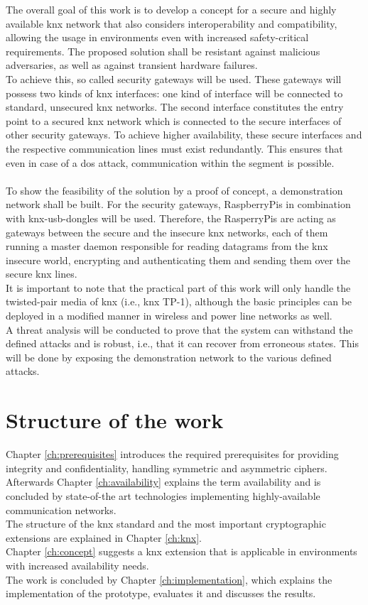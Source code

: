 The overall goal of this work is to develop a concept for a secure and highly available \gls{knx} network that also considers interoperability and compatibility, 
allowing the usage in environments even with increased safety-critical requirements. The proposed solution shall be resistant against malicious adversaries, as well as against
transient hardware failures.
\\
To achieve this, so called security gateways will be used. These gateways will possess two kinds of \gls{knx} interfaces: one kind of interface will be
connected to standard, unsecured \gls{knx} networks.
The second interface constitutes the entry point to a secured \gls{knx} network which is connected to the secure interfaces of other
security gateways. To achieve higher availability, these secure interfaces and the respective communication lines must exist redundantly. This ensures that
even in case of a \gls{dos} attack, communication within the segment is possible.
\\
\\
To show the feasibility of the solution by a proof of concept, a demonstration network shall be built.
For the security gateways, RaspberryPis in combination with \gls{knx}-\gls{usb}-dongles will be used. Therefore, the RasperryPis
are acting as gateways between the secure and the insecure \gls{knx} networks, each of them running a master daemon responsible
for reading datagrams from the \gls{knx} insecure world, encrypting and authenticating them and sending them over the secure
\gls{knx} lines.
\\
It is important to note that the practical part of this work will only
handle the twisted-pair media of \gls{knx} (i.e., \gls{knx} \gls{TP}-1), although the basic principles can be deployed in a modified manner in
wireless and power line networks as well.
\\
A threat analysis will be conducted to prove that the system can withstand the defined attacks and is robust,
i.e., that it can recover from erroneous states. This will be done by exposing the demonstration network to the various defined attacks. 

\section{Structure of the work}

Chapter \ref{ch:prerequisites} introduces the required prerequisites for providing integrity and confidentiality, handling symmetric and asymmetric ciphers. 
Afterwards Chapter \ref{ch:availability} explains the term availability and is concluded by state-of-the art technologies implementing highly-available communication networks.
\\
The structure of the \gls{knx} standard and the most important cryptographic extensions are explained in Chapter \ref{ch:knx}.   
\\
Chapter \ref{ch:concept} suggests a \gls{knx} extension that is applicable in environments with increased availability needs.
\\
The work is concluded by Chapter \ref{ch:implementation}, which explains the implementation of the prototype, evaluates it and discusses the results.



